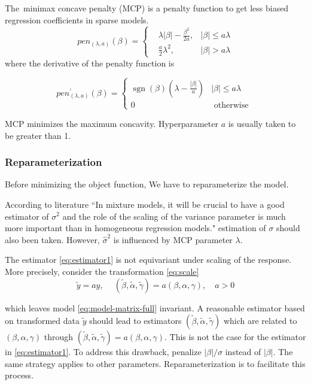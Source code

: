 \documentclass[12pt, a4paper, oneside]{article}
\numberwithin{equation}{section}
\begin{document}
The minimax concave penalty (MCP) is a penalty function to get less biased regression coefficients in sparse models. 
\begin{equation}
	\label{eq:mcp}
	pen_{(\lambda, a)}(\beta) = \left\{
	\begin{aligned}
		&\lambda |\beta| - \frac{\beta^2}{2a}, & |\beta| \leq a\lambda \\
		&\frac{a}{2}\lambda^2, & |\beta| > a\lambda
	\end{aligned}
	\right.
\end{equation}
where the derivative of the penalty function is

\begin{equation}
	pen_{(\lambda, a)}^{\prime}(\beta)= \begin{cases}\operatorname{sgn}(\beta)\left(\lambda-\frac{|\beta|}{a}\right) & |\beta| \leq a \lambda \\ 0 & \text { otherwise }\end{cases}
\end{equation}

MCP minimizes the maximum concavity. Hyperparameter $a$ is usually taken to be greater than 1.

\subsubsection{Reparameterization}
\label{subsubsec:reparameterization}

Before minimizing the object function, We have to reparameterize the model.

According to literature \cite{L1} ``In mixture models, it will be crucial to have a good estimator of $\sigma^2$ and the role of the scaling of the variance parameter is much more important than in homogeneous regression models." estimation of $\sigma$ should also been taken. However, $\hat\sigma^2$ is influenced by MCP parameter $\lambda$. 

The estimator \ref{eq:estimator1} is not equivariant under scaling of the response. More precisely, consider the transformation \ref{eq:scale}
\begin{equation}
	\label{eq:scale}
	\tilde{y} = ay,\ \quad (\tilde{\beta}, \tilde{\alpha}, \tilde{\gamma}) = a(\beta, \alpha, \gamma), \quad a > 0
\end{equation}

which leaves model \ref{eq:model-matrix-full} invariant. A reasonable estimator based on transformed data $\tilde{y}$ should lead to estimators $(\tilde{\beta}, \tilde{\alpha}, \tilde{\gamma})$ which are related to $(\beta, \alpha, \gamma)$ through $(\tilde{\beta}, \tilde{\alpha}, \tilde{\gamma}) = a(\beta, \alpha, \gamma)$. This is not the case for the estimator in \ref{eq:estimator1}. To address this drawback, penalize $|\beta|/\sigma$ instead of $|\beta|$. The same strategy applies to other parameters. Reparameterization is to facilitate this process.
\end{document}
